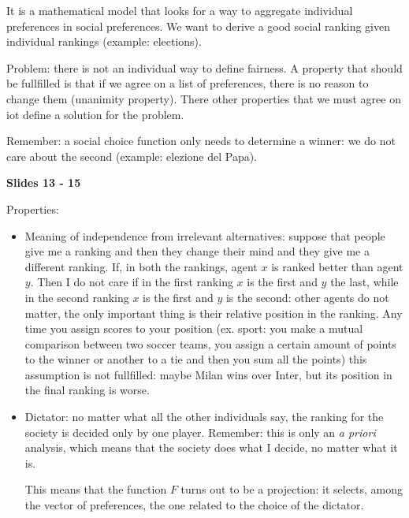 
%



\bigskip
\noindent It is a mathematical model that looks for a way to aggregate 
individual preferences in social preferences. We want to derive a good social 
ranking given individual rankings (example: elections).

\noindent Problem: there is not an individual way to define fairness. A property 
that should be fullfilled is that if we agree on a list of preferences, there 
is no reason to change them (unanimity property). There other properties that 
we must agree on iot define a solution for the problem.

\noindent Remember: a social choice function only needs to determine a winner: 
we do not care about the second (example: elezione del Papa).

\bigskip
\noindent \textbf{Slides 13 - 15}

\noindent Properties:

\begin{itemize}
\item Meaning of independence from irrelevant alternatives: suppose that 
people give me a ranking and then they change their mind and they give me a 
different ranking. If, in both the rankings, agent $x$ is ranked better than 
agent $y$. Then I do not care if in the first ranking $x$ is the first and $y$ 
the last, while in the second ranking $x$ is the first and $y$ is the second: 
other agents do not matter, the only important thing is their relative position 
in the ranking. Any time you assign scores to your position (ex. sport: you make 
a mutual comparison between two soccer teams, you assign a certain amount 
of points to the winner or another to a tie and then you sum all the points) 
this assumption is not fullfilled: maybe Milan wins over Inter, but its position 
in the final ranking is worse.

\item Dictator: no matter what all the other individuals say, the ranking 
for the society is decided only by one player. Remember: this is only an 
\textit{a priori} analysis, which means that the society does what I decide, no 
matter what it is.

\noindent This means that the function $F$ turns out to be a projection: it 
selects, among the vector of preferences, the one related to the choice of the 
dictator.
\end{itemize}

